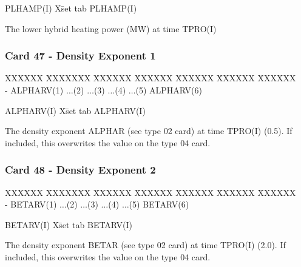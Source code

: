 \begin{tabbing}
PLHAMP(I) X\= set tab \kill
PLHAMP(I) \> \parbox[t]{\width}{The lower hybrid heating power (MW) at time TPRO(I)}
\end{tabbing}
\newpage \subsubsection{Card 47 - Density Exponent 1}
\begin{tabbing}
XXXXXX \= XXXXXXX \= XXXXXX \= XXXXXX \= XXXXXX \= XXXXXX \=
XXXXXX       \\
\footnotesize - \>\footnotesize  ALPHARV(1) \>\footnotesize $\ldots$(2) \>\footnotesize
$\ldots$(3) \>\footnotesize $\ldots$(4) \>\footnotesize $\ldots$(5) \>\footnotesize ALPHARV(6)
\\
\end{tabbing}
\begin{tabbing}
ALPHARV(I) X\= set tab \kill
ALPHARV(I) \> \parbox[t]{\width}{The density exponent ALPHAR (see type 02 card)
at time TPRO(I) (0.5).  If included, this overwrites the value on the type 04 card.}
\end{tabbing}
\pagebreak
\subsubsection{Card 48 - Density Exponent 2}
\begin{tabbing}
XXXXXX \= XXXXXXX \= XXXXXX \= XXXXXX \= XXXXXX \= XXXXXX \=
XXXXXX       \\
\footnotesize - \>\footnotesize  BETARV(1) \>\footnotesize $\ldots$(2) \>\footnotesize $\ldots$(3)
\>\footnotesize $\ldots$(4) \>\footnotesize $\ldots$(5) \>\footnotesize BETARV(6) \\
\end{tabbing}
\begin{tabbing}
BETARV(I) X\= set tab \kill
BETARV(I) \> \parbox[t]{\width}{The density exponent BETAR (see type 02 card)
 at time TPRO(I) (2.0).  If included, this overwrites the value on the type 04 card.}
\end{tabbing}

